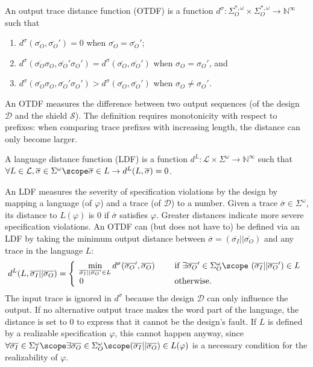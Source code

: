 \documentclass{llncs}
\newcommand{\NI}{\mathbb{N}^{\infty}}
\newcommand{\design}{\mathcal{D}}
\newcommand{\shield}{\mathcal{S}}
\newcommand{\dinalph}{\Sigma_I}
\newcommand{\dintrace}{{\overline{\sigma_I}}}
\newcommand{\doutalph}{\Sigma_O}
\newcommand{\doutletter}{{\sigma_O}}
\newcommand{\douttrace}{{\overline{\sigma_O}}}
\newcommand{\dalph}{\Sigma}
\newcommand{\dletter}{\sigma}
\newcommand{\dtrace}{\overline{\dletter}}
\newcommand{\lang}{L}
\newcommand{\langset}{\mathcal{L}}
\newcommand{\spec}{\varphi}
\newcommand{\distt}{d^\sigma}
\newcommand{\distl}{d^L}
\begin{document}
\begin{definition}
An output trace distance function (OTDF) is a function $\distt: 
\doutalph^{*,\omega} \times \doutalph^{*,\omega} \rightarrow \NI$ such 
that
\begin{enumerate}
\item $\distt(\douttrace,\douttrace') = 0$ 
      when $\douttrace = \douttrace'$; 
\item $\distt(\douttrace\doutletter, \douttrace'\doutletter') = 
       \distt(\douttrace,\douttrace') $ 
      when $\doutletter = \doutletter'$, and
\item $\distt(\douttrace\doutletter, \douttrace'\doutletter') >
       \distt(\douttrace,\douttrace') $ 
      when $\doutletter \neq \doutletter'$.
\end{enumerate}
\end{definition}

\noindent
An OTDF measures the difference between two output sequences (of the 
design $\design$ and the shield $\shield$).  The definition requires 
monotonicity with respect to prefixes: when comparing trace prefixes 
with increasing length, the distance can only become larger.  

\begin{definition}
A language distance function (LDF) is a function $\distl: \langset 
\times \dalph^\omega \rightarrow \NI$ such that 
$\forall \lang \in \langset, \dtrace \in \dalph^\omega \scope 
 \dtrace \in \lang \rightarrow \distl(\lang, \dtrace) = 0$.
\end{definition}

\noindent
An LDF measures the severity of specification violations by the design 
by mapping a language (of $\spec$) and a trace (of $\design$) to a 
number.  Given a trace $\dtrace\in\dalph^\omega$, its distance to 
$L(\spec)$ is 0 if $\dtrace$ satisfies $\spec$.  Greater distances 
indicate more severe specification violations.  An OTDF can (but does 
not have to) be defined via an LDF by taking the minimum output distance 
between $\dtrace = (\dintrace ||\douttrace)$ and any trace in the 
language $L$:
$$\distl(\lang, \dintrace ||\douttrace) =
\left\{
\begin{array}{ll}
\min\limits_{\dintrace || \douttrace' \in \lang} 
  \distt(\douttrace', \douttrace)
  &\quad\text{ if } \exists \douttrace'\in \doutalph^\omega \scope~
                (\dintrace||\douttrace') \in \lang \\
0
  &\quad\text{ otherwise.}
\end{array}
\right.
$$
The input trace is ignored in $\distt$ because the design $\design$ can 
only influence the output.  If no alternative output trace makes the 
word part of the language, the distance is set to $0$ to express that it 
cannot be the design's fault. If $\lang$ is defined by a realizable 
specification $\spec$, this cannot happen anyway, since $\forall 
\dintrace\in \dinalph^\omega \scope \exists \douttrace\in 
\doutalph^\omega \scope (\dintrace || \douttrace) \in \lang(\spec)$ is a 
necessary condition for the realizability of $\spec$.
\end{document}
